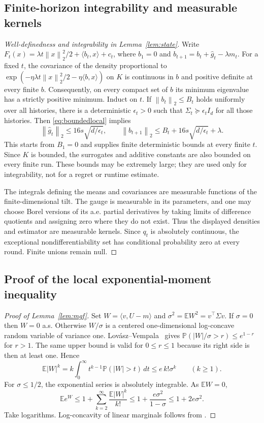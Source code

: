 \documentclass[11pt]{article}
\numberwithin{equation}{section}
\newcommand{\E}{\mathbb E}
\newcommand{\Pp}{\mathbb P}
\newcommand{\ip}[2]{\langle #1,#2\rangle}
\newcommand{\norm}[1]{\left\|#1\right\|}
\theoremstyle{definition}
\theoremstyle{remark}
\begin{document}
\subsection{Finite-horizon integrability and measurable kernels}
\begin{proof}[Well-definedness and integrability in Lemma~\ref{lem:state}]
Write $F_t(x)=\lambda t\norm{x}_2^2/2+\ip{b_t}x+c_t$, where
$b_1=0$ and $b_{t+1}=b_t+\widehat g_t-\lambda m_t$.
For a fixed $t$, the covariance of the density proportional to
$\exp(-\eta\lambda t\norm{x}_2^2/2-\eta\ip bx)$ on $K$ is continuous in $b$
and positive definite at every finite $b$. Consequently, on every compact
set of $b$ its minimum eigenvalue has a strictly positive minimum.
Induct on $t$. If $\norm{b_t}_2\leq B_t$ holds uniformly over all histories,
there is a deterministic $\epsilon_t>0$ such that
$\Sigma_t\succeq\epsilon_t I_d$ for all those histories. Then
\eqref{eq:boundedlocal} implies
\[
 \norm{\widehat g_t}_2\leq16s\sqrt{d/\epsilon_t},\qquad
 \norm{b_{t+1}}_2\leq B_t+16s\sqrt{d/\epsilon_t}+\lambda.
\]
This starts from $B_1=0$ and supplies finite deterministic bounds at every
finite $t$. Since $K$ is bounded, the surrogates and additive constants are
also bounded on every finite run. These bounds may be extremely large;
they are used only for integrability, not for a regret or runtime estimate.

The integrals defining the means and covariances are measurable functions
of the finite-dimensional tilt. The gauge is measurable in its parameters,
and one may choose Borel versions of its a.e. partial derivatives by taking
limits of difference quotients and assigning zero where they do not exist.
Thus the displayed densities and estimator are measurable kernels. Since
$q_t$ is absolutely continuous, the exceptional nondifferentiability set
has conditional probability zero at every round. Finite unions remain null.
\end{proof}


\subsection{Proof of the local exponential-moment inequality}
\begin{proof}[Proof of Lemma~\ref{lem:mgf}]
Set $W=\ip v{U-m}$ and $\sigma^2=\E W^2=v^\top\Sigma v$.
If $\sigma=0$ then $W=0$ a.s. Otherwise $W/\sigma$
is a centered one-dimensional log-concave random variable of variance one.
Lov\'asz--Vempala~\cite[Lemma 5.7]{LV07} gives
$\Pp(|W|/\sigma>r)\leq e^{1-r}$ for $r>1$. The same upper bound is valid for
$0\leq r\leq1$ because its right side is then at least one. Hence
\[
 \E|W|^k
 =k\int_0^\infty t^{k-1}\Pp(|W|>t)\,dt
 \leq e\,k!\sigma^k\qquad(k\geq1).
\]
For $\sigma\leq1/2$, the exponential series is absolutely integrable. As
$\E W=0$,
\[
 \E e^W\leq1+\sum_{k=2}^{\infty}\frac{\E|W|^k}{k!}
 \leq1+\frac{e\sigma^2}{1-\sigma}\leq1+2e\sigma^2.
\]
Take logarithms. Log-concavity of linear marginals follows from
\cite[Theorem 5.1]{LV07}.
\end{proof}
\end{document}
